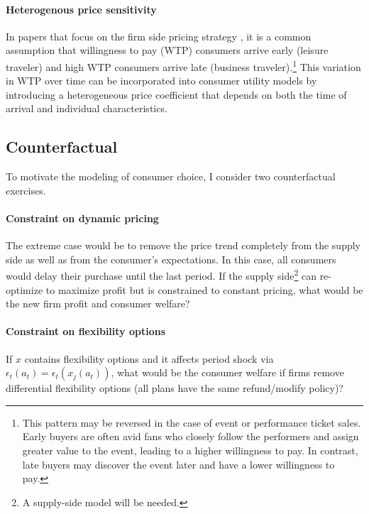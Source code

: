 \documentclass[12pt]{article}
\begin{document}
\paragraph{Heterogenous price sensitivity} In papers that focus on the firm side pricing strategy
\citep{williams2022welfare,betancourt2022dynamic}, it is a common assumption
that willingness to pay (WTP) consumers arrive early (leisure traveler) and
high WTP consumers arrive late (business traveler).\footnote{This pattern may
    be reversed in the case of event or performance ticket sales. Early buyers are
    often avid fans who closely follow the performers and assign greater value to
    the event, leading to a higher willingness to pay. In contrast, late buyers may
    discover the event later and have a lower willingness to pay.} This variation
in WTP over time can be incorporated into consumer utility models by
introducing a heterogeneous price coefficient that depends on both the time of
arrival and individual characteristics.


\subsection{Counterfactual}
To motivate the modeling of consumer choice, I consider two counterfactual
exercises.

\paragraph{Constraint on dynamic pricing} The extreme case would be to remove the price trend completely from the supply
side as well as from the consumer's expectations. In this case, all consumers
would delay their purchase until the last period. If the supply side\footnote{A
    supply-side model will be needed.} can re-optimize to maximize profit but is
constrained to constant pricing, what would be the new firm profit and consumer
welfare?

\paragraph{Constraint on flexibility options}
If $x$ contains flexibility options and it affects period shock via
$\epsilon_t(a_t)=\epsilon_t(x_j(a_t))$, what would be the consumer welfare if
firms remove differential flexibility options (all plans have the same
refund/modify policy)?

\pagebreak \newpage 
\end{document}
